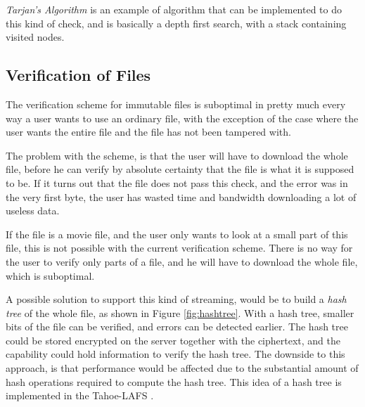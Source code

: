 \documentclass[pdftex,english,10pt,b5paper,twoside]{book}
\begin{document}
\emph{Tarjan's Algorithm} \cite{tarjan} is an example of algorithm that can be
implemented to do this kind of check, and is basically a depth first search,
with a stack containing visited nodes.

\subsection{Verification of Files}

The verification scheme for immutable files is suboptimal in pretty much every
way a user wants to use an ordinary file, with the exception of the case where
the user wants the entire file and the file has not been tampered with.

The problem with the scheme, is that the user will have to download the whole
file, before he can verify by absolute certainty that the file is what it is
supposed to be. If it turns out that the file does not pass this check, and
the error was in the very first byte, the user has wasted time and bandwidth
downloading a lot of useless data.

If the file is a movie file, and the user only wants to look at a
small part of this file, this is not possible with the current verification
scheme. There is no way for the user to verify only parts of a
file, and he will have to download the whole file, which is suboptimal.

A possible solution to support this kind of streaming, would be to build a
\emph{hash tree} of the whole file, as shown in Figure \ref{fig:hashtree}. With
a hash tree, smaller bits of the file can be verified, and errors can be
detected earlier. The hash tree could be stored encrypted on the server
together with the ciphertext, and the capability could hold information to
verify the hash tree. The downside to this approach, is that performance would
be affected due to the substantial amount of hash operations required to
compute the hash tree. This idea of a hash tree is implemented in the
Tahoe-\ac{LAFS} \cite{tahoe}.
\end{document}
